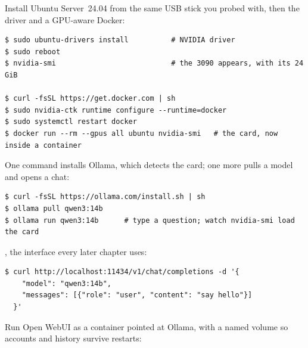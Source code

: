 
 Install Ubuntu Server~24.04 from the same USB
stick you probed with, then the driver and a GPU-aware Docker:

\begin{verbatim}
$ sudo ubuntu-drivers install          # NVIDIA driver
$ sudo reboot
$ nvidia-smi                           # the 3090 appears, with its 24 GiB

$ curl -fsSL https://get.docker.com | sh
$ sudo nvidia-ctk runtime configure --runtime=docker
$ sudo systemctl restart docker
$ docker run --rm --gpus all ubuntu nvidia-smi   # the card, now inside a container
\end{verbatim}


 One command installs Ollama,
which detects the card; one more pulls a model and opens a chat:

\begin{verbatim}
$ curl -fsSL https://ollama.com/install.sh | sh
$ ollama pull qwen3:14b
$ ollama run qwen3:14b      # type a question; watch nvidia-smi load the card
\end{verbatim}

, the interface every later chapter
uses:

\begin{verbatim}
$ curl http://localhost:11434/v1/chat/completions -d '{
    "model": "qwen3:14b",
    "messages": [{"role": "user", "content": "say hello"}]
  }'
\end{verbatim}

 Run Open WebUI as a container pointed at Ollama,
with a named volume so accounts and history survive restarts:

